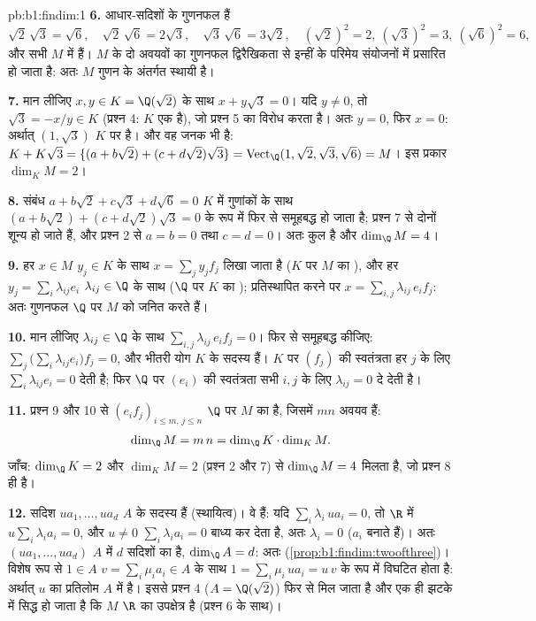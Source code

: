 \begin{solution}{pb:b1:findim:1}
\textbf{6.} आधार-सदिशों के गुणनफल हैं
\[
\sqrt2\,\sqrt3 = \sqrt6,\quad
\sqrt2\,\sqrt6 = 2\sqrt3,\quad
\sqrt3\,\sqrt6 = 3\sqrt2,\quad
(\sqrt2)^2 = 2,\ (\sqrt3)^2 = 3,\ (\sqrt6)^2 = 6,
\]
और सभी $M$ में हैं। $M$ के दो अवयवों का गुणनफल द्विरैखिकता से इन्हीं के
परिमेय संयोजनों में प्रसारित हो जाता है: अतः $M$ गुणन के अंतर्गत स्थायी है।

\textbf{7.} मान लीजिए $x, y \in K = \Q(\sqrt2)$ के साथ $x + y\sqrt3 = 0$।
यदि $y \neq 0$, तो $\sqrt3 = -x/y \in K$ (प्रश्न 4: $K$ एक  है), जो
प्रश्न 5 का विरोध करता है। अतः $y = 0$, फिर $x = 0$: अर्थात् $(1, \sqrt3)$
$K$ पर  है। और वह जनक भी है: $K + K\sqrt3 = \{(a + b\sqrt2) + (c +
d\sqrt2)\sqrt3\} = \operatorname{Vect}_\Q (1, \sqrt2, \sqrt3, \sqrt6) = M$।
इस प्रकार $\dim_K M = 2$।

\textbf{8.} संबंध $a + b\sqrt2 + c\sqrt3 + d\sqrt6 = 0$ $K$ में गुणांकों के
साथ $(a + b\sqrt2) + (c + d\sqrt2)\sqrt3 = 0$ के रूप में फिर से समूहबद्ध हो
जाता है; प्रश्न 7 से दोनों शून्य हो जाते हैं, और प्रश्न 2 से $a = b = 0$ तथा
$c = d = 0$। अतः कुल  है और $\dim_\Q M = 4$।

\textbf{9.} हर $x \in M$ $y_j \in K$ के साथ $x = \sum_j y_j f_j$ लिखा जाता
है ($K$ पर $M$ का ), और हर $y_j = \sum_i \lambda_{ij} e_i$ $\lambda_{ij}
\in \Q$ के साथ ($\Q$ पर $K$ का ); प्रतिस्थापित करने पर $x = \sum_{i,j}
\lambda_{ij}\, e_i f_j$: अतः गुणनफल $\Q$ पर $M$ को जनित करते हैं।

\textbf{10.} मान लीजिए $\lambda_{ij} \in \Q$ के साथ $\sum_{i,j}
\lambda_{ij}\, e_i f_j = 0$। फिर से समूहबद्ध कीजिए: $\sum_j \bigl(\sum_i
\lambda_{ij} e_i\bigr) f_j = 0$, और भीतरी योग $K$ के सदस्य हैं। $K$ पर
$(f_j)$ की स्वतंत्रता हर $j$ के लिए $\sum_i \lambda_{ij} e_i = 0$ देती है;
फिर $\Q$ पर $(e_i)$ की स्वतंत्रता सभी $i, j$ के लिए $\lambda_{ij} = 0$ दे
देती है।

\textbf{11.} प्रश्न 9 और 10 से $(e_i f_j)_{i \leq m,\, j \leq n}$ $\Q$ पर
$M$ का  है, जिसमें $mn$ अवयव हैं:
\[
\dim_\Q M = m\,n = \dim_\Q K \cdot \dim_K M .
\]
जाँच: $\dim_\Q K = 2$ और $\dim_K M = 2$ (प्रश्न 2 और 7) से $\dim_\Q M = 4$
मिलता है, जो प्रश्न 8 ही है।

\textbf{12.} सदिश $u a_1, \dots, u a_d$ $A$ के सदस्य हैं (स्थायित्व)। वे
 हैं: यदि $\sum_i \lambda_i\, u a_i = 0$, तो $\R$ में $u \sum_i
\lambda_i a_i = 0$, और $u \neq 0$ $\sum_i \lambda_i a_i = 0$ बाध्य कर देता
है, अतः $\lambda_i = 0$ ($a_i$  बनाते हैं)। अतः $(u a_1, \dots, u a_d)$
$A$ में $d$ सदिशों का  है, $\dim_\Q A = d$: अतः 
(\cref{prop:b1:findim:twoofthree})। विशेष रूप से $1 \in A$ $v = \sum_i \mu_i
a_i \in A$ के साथ $1 = \sum_i \mu_i\, u a_i = u\,v$ के रूप में विघटित होता
है: अर्थात् $u$ का प्रतिलोम $A$ में है। इससे प्रश्न 4 ($A = \Q(\sqrt2)$) फिर
से मिल जाता है और एक ही झटके में सिद्ध हो जाता है कि $M$ $\R$ का उपक्षेत्र
है (प्रश्न 6 के साथ)।


\end{solution}
